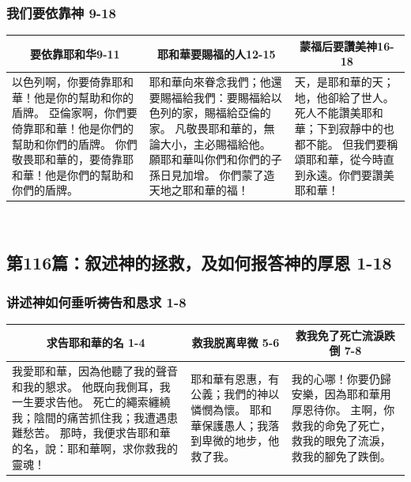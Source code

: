 \subsubsection{我们要依靠神 9-18}
\begin{table}[H]
\centering
\begin{tabular}{p{}|p{6.2500cm}|p{4.75cm}}\hline\hline
\multicolumn{1}{c|}{要依靠耶和华9-11}&\multicolumn{1}{c|}{耶和華要賜福的人12-15}&\multicolumn{1}{c}{蒙福后要讚美神16-18}\\\hline
以色列啊，你要倚靠耶和華！他是你的幫助和你的盾牌。
亞倫家啊，你們要倚靠耶和華！他是你們的幫助和你們的盾牌。
你們敬畏耶和華的，要倚靠耶和華！他是你們的幫助和你們的盾牌。
&耶和華向來眷念我們；他還要賜福給我們：要賜福給以色列的家，賜福給亞倫的家。
凡敬畏耶和華的，無論大小，主必賜福給他。
願耶和華叫你們和你們的子孫日見加增。
你們蒙了造天地之耶和華的福！
&天，是耶和華的天；地，他卻給了世人。
死人不能讚美耶和華；下到寂靜中的也都不能。
但我們要稱頌耶和華，從今時直到永遠。你們要讚美耶和華！\\\hline
\end{tabular}
\end{table} 





\subsection{第116篇：叙述神的拯救，及如何报答神的厚恩 1-18}
\subsubsection{讲述神如何垂听祷告和恳求 1-8}
\begin{table}[H]
\centering
\begin{tabular}{p{}|p{4.00cm}|p{4.75cm}}\hline\hline
\multicolumn{1}{c|}{求告耶和華的名 1-4}&\multicolumn{1}{c|}{救我脱离卑微 5-6}&\multicolumn{1}{c}{救我免了死亡流淚跌倒 7-8}\\\hline
我愛耶和華，因為他聽了我的聲音和我的懇求。
他既向我側耳，我一生要求告他。
死亡的繩索纏繞我；陰間的痛苦抓住我；我遭遇患難愁苦。
那時，我便求告耶和華的名，說：耶和華啊，求你救我的靈魂！
&耶和華有恩惠，有公義；我們的神以憐憫為懷。
耶和華保護愚人；我落到卑微的地步，他救了我。
&我的心哪！你要仍歸安樂，因為耶和華用厚恩待你。
主啊，你救我的命免了死亡，救我的眼免了流淚，救我的腳免了跌倒。\\\hline
\end{tabular}
\end{table} 


